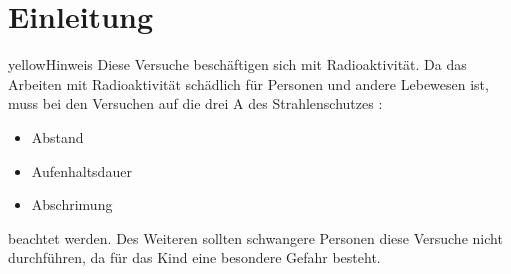 \documentclass[../protokoll.tex]{subfiles}
\begin{document}
\part{Einleitung}
\begin{messageBox}{yellow}{Hinweis}
Diese Versuche beschäftigen sich mit Radioaktivität. Da das Arbeiten mit
Radioaktivität schädlich für Personen und andere Lebewesen ist, muss bei den
Versuchen auf die drei A des Strahlenschutzes \cite{AAA-Regel}:
\begin{itemize}
    \item Abstand
    \item Aufenhaltsdauer
    \item Abschrimung
\end{itemize}
beachtet werden. Des Weiteren sollten schwangere Personen diese Versuche nicht
durchführen, da für das Kind eine besondere Gefahr besteht.
\end{messageBox}
\end{document}
